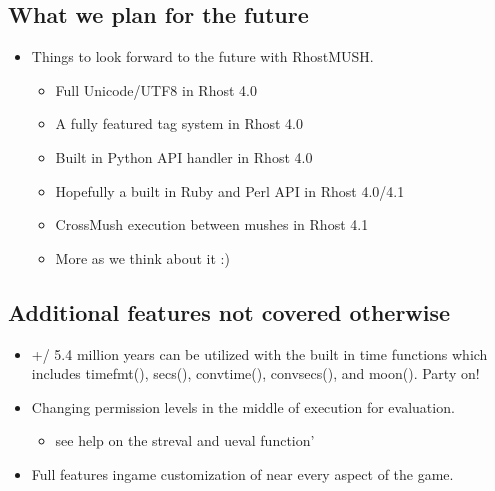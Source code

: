 \documentclass[letterpaper,10pt,english]{sphinxmanual}
\begin{document}
\subsection{What we plan for the future}
\label{\detokenize{features:what-we-plan-for-the-future}}\begin{itemize}
\item {} 
\sphinxAtStartPar
Things to look forward to the future with RhostMUSH.
\begin{itemize}
\item {} 
\sphinxAtStartPar
Full Unicode/UTF8 in Rhost 4.0

\item {} 
\sphinxAtStartPar
A fully featured tag system in Rhost 4.0

\item {} 
\sphinxAtStartPar
Built in Python API handler in Rhost 4.0

\item {} 
\sphinxAtStartPar
Hopefully a built in Ruby and Perl API in Rhost 4.0/4.1

\item {} 
\sphinxAtStartPar
Cross\sphinxhyphen{}Mush execution between mushes in Rhost 4.1

\item {} 
\sphinxAtStartPar
More as we think about it :)

\end{itemize}

\end{itemize}


\subsection{Additional features not covered otherwise}
\label{\detokenize{features:additional-features-not-covered-otherwise}}\begin{itemize}
\item {} 
\sphinxAtStartPar
+/\sphinxhyphen{} 5.4 million years can be utilized with the built in time functions
which includes timefmt(), secs(), convtime(), convsecs(), and moon().  Party on!

\item {} 
\sphinxAtStartPar
Changing permission levels in the middle of execution for evaluation.
\begin{itemize}
\item {} 
\sphinxAtStartPar
see help on the streval and ueval function’

\end{itemize}

\item {} 
\sphinxAtStartPar
Full features in\sphinxhyphen{}game customization of near every aspect of the game.

\end{itemize}
\end{document}
